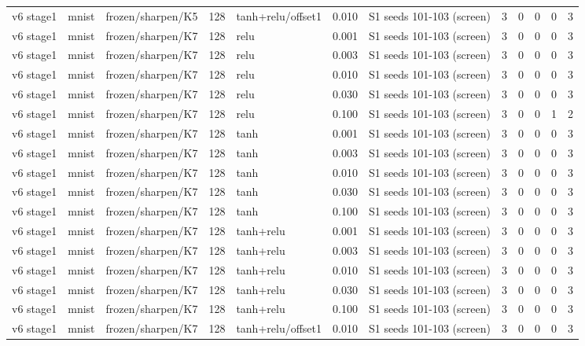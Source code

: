 \begin{table}[htbp]
{\begin{tabular}{@{}lllrlrlrrrrr@{}}
v6 stage1 & mnist & frozen/sharpen/K5 & 128 & tanh+relu/offset1 & 0.010 & S1 seeds 101-103 (screen) & 3 & 0 & 0 & 0 & 3 \\
v6 stage1 & mnist & frozen/sharpen/K7 & 128 & relu & 0.001 & S1 seeds 101-103 (screen) & 3 & 0 & 0 & 0 & 3 \\
v6 stage1 & mnist & frozen/sharpen/K7 & 128 & relu & 0.003 & S1 seeds 101-103 (screen) & 3 & 0 & 0 & 0 & 3 \\
v6 stage1 & mnist & frozen/sharpen/K7 & 128 & relu & 0.010 & S1 seeds 101-103 (screen) & 3 & 0 & 0 & 0 & 3 \\
v6 stage1 & mnist & frozen/sharpen/K7 & 128 & relu & 0.030 & S1 seeds 101-103 (screen) & 3 & 0 & 0 & 0 & 3 \\
v6 stage1 & mnist & frozen/sharpen/K7 & 128 & relu & 0.100 & S1 seeds 101-103 (screen) & 3 & 0 & 0 & 1 & 2 \\
v6 stage1 & mnist & frozen/sharpen/K7 & 128 & tanh & 0.001 & S1 seeds 101-103 (screen) & 3 & 0 & 0 & 0 & 3 \\
v6 stage1 & mnist & frozen/sharpen/K7 & 128 & tanh & 0.003 & S1 seeds 101-103 (screen) & 3 & 0 & 0 & 0 & 3 \\
v6 stage1 & mnist & frozen/sharpen/K7 & 128 & tanh & 0.010 & S1 seeds 101-103 (screen) & 3 & 0 & 0 & 0 & 3 \\
v6 stage1 & mnist & frozen/sharpen/K7 & 128 & tanh & 0.030 & S1 seeds 101-103 (screen) & 3 & 0 & 0 & 0 & 3 \\
v6 stage1 & mnist & frozen/sharpen/K7 & 128 & tanh & 0.100 & S1 seeds 101-103 (screen) & 3 & 0 & 0 & 0 & 3 \\
v6 stage1 & mnist & frozen/sharpen/K7 & 128 & tanh+relu & 0.001 & S1 seeds 101-103 (screen) & 3 & 0 & 0 & 0 & 3 \\
v6 stage1 & mnist & frozen/sharpen/K7 & 128 & tanh+relu & 0.003 & S1 seeds 101-103 (screen) & 3 & 0 & 0 & 0 & 3 \\
v6 stage1 & mnist & frozen/sharpen/K7 & 128 & tanh+relu & 0.010 & S1 seeds 101-103 (screen) & 3 & 0 & 0 & 0 & 3 \\
v6 stage1 & mnist & frozen/sharpen/K7 & 128 & tanh+relu & 0.030 & S1 seeds 101-103 (screen) & 3 & 0 & 0 & 0 & 3 \\
v6 stage1 & mnist & frozen/sharpen/K7 & 128 & tanh+relu & 0.100 & S1 seeds 101-103 (screen) & 3 & 0 & 0 & 0 & 3 \\
v6 stage1 & mnist & frozen/sharpen/K7 & 128 & tanh+relu/offset1 & 0.010 & S1 seeds 101-103 (screen) & 3 & 0 & 0 & 0 & 3 \\

\end{tabular}}
\end{table}
